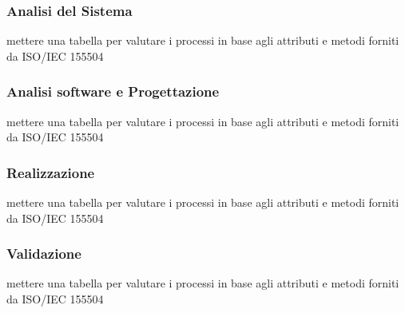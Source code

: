 \subsubsection{Analisi del Sistema}
mettere una tabella per valutare i processi in base agli attributi e metodi forniti da ISO/IEC 155504
\subsubsection{Analisi software e Progettazione}
mettere una tabella per valutare i processi in base agli attributi e metodi forniti da ISO/IEC 155504
\subsubsection{Realizzazione}
mettere una tabella per valutare i processi in base agli attributi e metodi forniti da ISO/IEC 155504
\subsubsection{Validazione}
mettere una tabella per valutare i processi in base agli attributi e metodi forniti da ISO/IEC 155504

